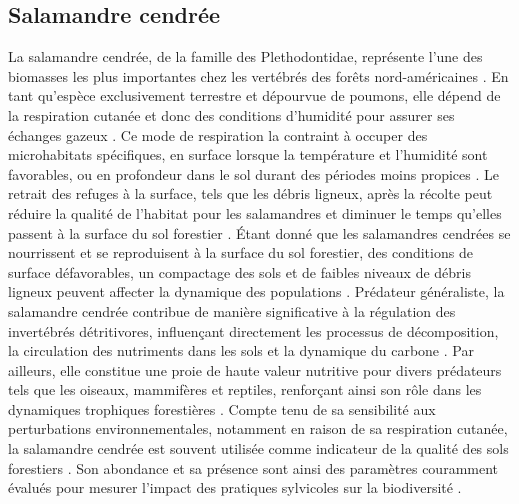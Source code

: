 \subsection*{Salamandre cendrée}

La salamandre cendrée, de la famille des Plethodontidae, représente l'une des biomasses les plus importantes chez les vertébrés des forêts nord-américaines \citep{Burton1975Salamanderpopulations,Petranka1993Effectstimber,semlitschAbundanceBiomassProduction2014a}. 
En tant qu'espèce exclusivement terrestre et dépourvue de poumons, elle dépend de la respiration cutanée et donc des conditions d'humidité pour assurer ses échanges gazeux \citep{Heatwole1961Relationsubstrate}. 
Ce mode de respiration la contraint à occuper des microhabitats spécifiques, en surface lorsque la température et l'humidité sont favorables, ou en profondeur dans le sol durant des périodes moins propices \citep{Grizzell1949HibernationSite,FraserEmpiricalEvaluation1976,Jaeger1980MicrohabitatsTerrestrial}. 
Le retrait des refuges à la surface, tels que les débris ligneux, après la récolte peut réduire la qualité de l'habitat pour les salamandres et diminuer le temps qu'elles passent à la surface du sol forestier \citep{Achat2015Quantifyingconsequences,Peele2017EffectsWoody}. 
Étant donné que les salamandres cendrées se nourrissent et se reproduisent à la surface du sol forestier, des conditions de surface défavorables, un compactage des sols et de faibles niveaux de débris ligneux peuvent affecter la dynamique des populations \citep{Peterman2014Spatialvariation}. 
Prédateur généraliste, la salamandre cendrée contribue de manière significative à la régulation des invertébrés détritivores, influençant directement les processus de décomposition, la circulation des nutriments dans les sols et la dynamique du carbone \citep{Burton1975Energyflow,Wyman1998Experimentalassessment,Walton2013Topdownregulation,Hickerson2017Easternredbacked}. 
Par ailleurs, elle constitue une proie de haute valeur nutritive pour divers prédateurs tels que les oiseaux, mammifères et reptiles, renforçant ainsi son rôle dans les dynamiques trophiques forestières \citep{Burton1975Energyflow,Pough1987abundancesalamanders}. 
Compte tenu de sa sensibilité aux perturbations environnementales, notamment en raison de sa respiration cutanée, la salamandre cendrée est souvent utilisée comme indicateur de la qualité des sols forestiers \citep{Welsh2001caseusing}. 
Son abondance et sa présence sont ainsi des paramètres couramment évalués pour mesurer l'impact des pratiques sylvicoles sur la biodiversité \citep{Harpole1999Effectsseven,Grialou2000effectsforest,Homyack2009Longtermeffects,Hocking2013Effectsexperimental,Mazerolle2021Woodlandsalamander}. 

